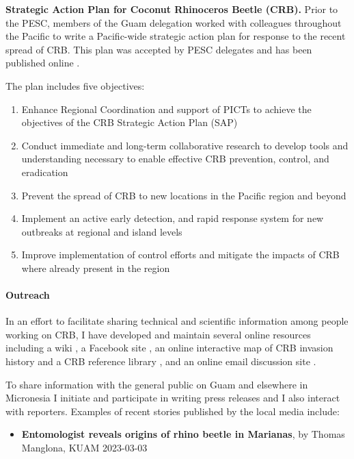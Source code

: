 \begin{refsection}
\textbf{Strategic Action Plan for Coconut Rhinoceros Beetle (CRB).}
Prior to the PESC, members of the Guam delegation worked with colleagues throughout the Pacific to write a Pacific-wide strategic action plan for response to the recent spread of CRB. This plan was accepted by PESC delegates and has been published online \cite{conferenceStrategicActionPlan2022}.

The plan includes five objectives:

\begin{enumerate}
	\item Enhance Regional Coordination and support of PICTs to achieve the
	objectives of the CRB Strategic Action Plan (SAP)
	\item Conduct immediate and long-term collaborative research to develop
	tools and understanding necessary to enable effective CRB prevention, control, and
	eradication
	\item Prevent the spread of CRB to new locations in the Pacific region and
	beyond
	\item Implement an active early detection, and rapid response system for new
	outbreaks at regional and island levels
	\item Improve implementation of control efforts and mitigate the impacts of
	CRB where already present in the region
	
\end{enumerate} 

\paragraph{Outreach} In an effort to facilitate sharing technical and scientific information among people working on CRB, I have developed and maintain several online resources including a wiki \parencite{moore_crb-g_2019}, a Facebook site \parencite{moore_facebook_2019}, an online interactive map of CRB invasion history \parencite{moore_online_2019} and a CRB reference library \parencite{moore_online_2021}, and an online email discussion site \parencite{moore_online_2021-1}.

To share information with the general public on Guam and elsewhere in Micronesia I initiate and participate in writing press releases and I also interact with reporters. Examples of recent stories published by the local media include:

\begin{itemize}
	
\item \textbf{Entomologist reveals origins of rhino beetle in Marianas}, by Thomas Manglona, KUAM 2023-03-03 \cite{manglonaEntomologistRevealsOrigins2023}


\end{itemize}
\end{refsection}
